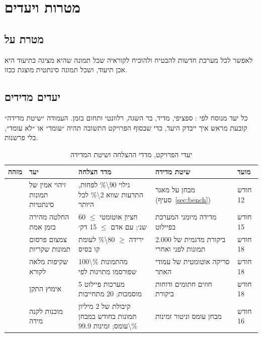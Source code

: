 \chapter{מטרות ויעדים}\label{ch:goals}

\section{מטרת על}
\begin{keybox}[מטרת על]
לאפשר לכל מערכת חדשות להבטיח ולהוכיח לקוראיה שכל תמונה שהיא מציגה כתיעוד היא אכן תיעוד, ושכל תמונה סינתטית מוצגת ככזו.
\end{keybox}

\section{יעדים מדידים}
כל יעד מנוסח לפי : ספציפי, מדיד, בר השגה, רלוונטי ותחום בזמן. העמודה ״שיטת מדידה״ קובעת מראש איך ייבדק היעד, כדי שבסוף הפרויקט התשובה תהיה ״עומד״ או ״לא עומד״, בלי פרשנות.

\begin{table}[!htb]\centering
\caption{יעדי הפרויקט, מדדי ההצלחה ושיטת המדידה}\label{tab:goals}
\small
\begin{tabularx}{\linewidth}{@{}l Y l Y l@{}}
\toprule
\textbf{מזהה} & \textbf{יעד} & \textbf{מדד הצלחה} & \textbf{שיטת מדידה} & \textbf{מועד} \\
\midrule
{} & זיהוי אמין של תמונות סינתטיות & גילוי \num{90\%} לפחות, התרעות שווא \num{2\%} לכל היותר & מבחן על מאגר  (סעיף~\ref{sec:bench}) & חודש \num{12} \\
 & החלטה מהירה בזמן אמת & חציון אוטומטי $\leq$ \num{60} שנ׳; עם אדם $\leq$ \num{15} דק׳ & מדידה מיומני המערכת בפיילוט & חודש \num{15} \\
 & צמצום פרסום תמונות שקריות & ירידה $\geq$ \num{80\%} לעומת קו בסיס & ביקורת מדגמית של \num{2,000} תמונות לפני ואחרי & חודש \num{18} \\
 & שקיפות מלאה לקורא & \num{100\%} מהתמונות שפורסמו מתויגות לפי  & סריקה אוטומטית של עמודי האתר & חודש \num{18} \\
 & אימוץ התקן & \num{5} מערכות פיילוט מוסמכות; \num{20} מתחייבות & חוזים חתומים ודוחות ביקורת & חודש \num{18} \\
 & מוכנות לקנה מידה & קיבולת של \num{2} מיליון תמונות בחודש במבחן עומס; זמינות \num{99.9\%} & מבחן עומס וניטור זמינות & חודש \num{16} \\
\bottomrule
\end{tabularx}
\end{table}

